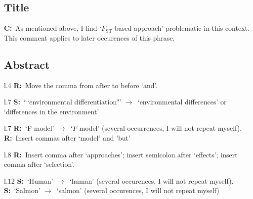 \documentclass[11pt]{article}
\newenvironment{my_description}
{\begin{description}
  \setlength{\itemsep}{2pt}
  \setlength{\parskip}{0pt}
  \setlength{\parsep}{0pt}}
{\end{description}}
\newcommand{\ra}{$\rightarrow$\ }
\newcommand{\C}{\textbf{C:}\ }
\newcommand{\R}{\textbf{R:}\ }
\newcommand{\V}{\textbf{S:}\ }
\begin{document}
\subsection{Title}
\C As mentioned above, I find `$F_{\mathrm{ST}}$-based approach' problematic in this context. This comment applies to later occurences of this phrase.

\subsection{Abstract}

\begin{my_description}
	\item[l.4] \R Move the comma from after to before `and'.
	\item[l.7] \V ```environmental differentiation"' \ra `environmental differences' or `differences in the environment'
	\item[l.7] \R `F model' \ra `$F$ model' (several occurrences, I will not repeat myself). \R Insert commas after `model' and 'but'
	\item[l.8] \R Insert comma after `approaches'; insert semicolon after `effects'; insert comma after `selection'.
	\item[l.12] \V `Human' \ra `human' (several occurences, I will not repeat myself). \V `Salmon' \ra `salmon' (several occurences, I will not repeat myself)
	
\end{my_description}
\end{document}
